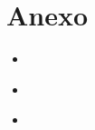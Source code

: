 \documentclass{article}
\newcommand{\python}[2]{
  \begin{itemize}
    \item[]
  \end{itemize}
}
\newcommand{\bash}[2]{
  \begin{itemize}
    \item[]
  \end{itemize}
}
\begin{document}
\lipsum[5]



\section{Anexo}\label{anexo}

  \python{src/plotter}{Generador de gráficos para todos los parámetros}
  \bash{src/run}{Ejecuta Weka dado los parámetros indicados}
  \bash{src/filter}{Filtra elementos específicos del dataset}
\end{document}
